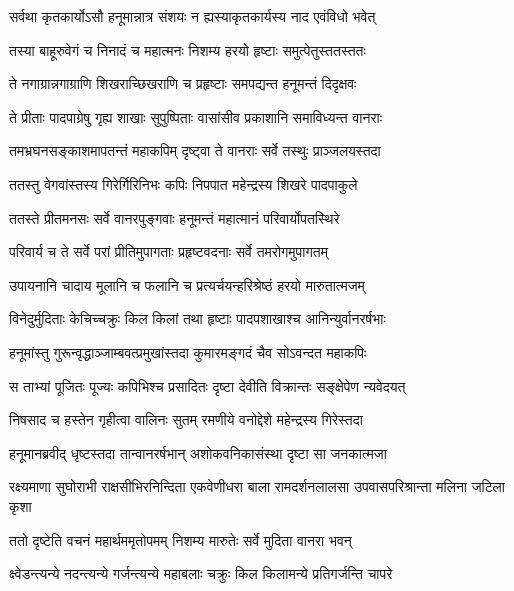 \twolineshloka
{सर्वथा कृतकार्योऽसौ हनूमान्नात्र संशयः}
{न ह्यस्याकृतकार्यस्य नाद एवंविधो भवेत्} %

\twolineshloka
{तस्या बाहूरुवेगं च निनादं च महात्मनः}
{निशम्य हरयो हृष्टाः समुत्पेतुस्ततस्ततः} %

\twolineshloka
{ते नगाग्रान्नगाग्राणि शिखराच्छिखराणि च}
{प्रहृष्टाः समपद्यन्त हनूमन्तं दिदृक्षवः} %

\twolineshloka
{ते प्रीताः पादपाग्रेषु गृह्य शाखाः सुपुष्पिताः}
{वासांसीव प्रकाशानि समाविध्यन्त वानराः} %

\twolineshloka
{तमभ्रघनसङ्काशमापतन्तं महाकपिम्}
{दृष्ट्वा ते वानराः सर्वे तस्थुः प्राञ्जलयस्तदा} %

\twolineshloka
{ततस्तु वेगवांस्तस्य गिरेर्गिरिनिभः कपिः}
{निपपात महेन्द्रस्य शिखरे पादपाकुले} %

\twolineshloka
{ततस्ते प्रीतमनसः सर्वे वानरपुङ्गवाः}
{हनूमन्तं महात्मानं परिवार्योपतस्थिरे} %

\twolineshloka
{परिवार्य च ते सर्वे परां प्रीतिमुपागताः}
{प्रहृष्टवदनाः सर्वे तमरोगमुपागतम्} %

\twolineshloka
{उपायनानि चादाय मूलानि च फलानि च}
{प्रत्यर्चयन्हरिश्रेष्ठं हरयो मारुतात्मजम्} %

\twolineshloka
{विनेदुर्मुदिताः केचिच्चक्रुः किल किलां तथा}
{हृष्टाः पादपशाखाश्च आनिन्युर्वानरर्षभाः} %

\twolineshloka
{हनूमांस्तु गुरून्वृद्धाञ्जाम्बवत्प्रमुखांस्तदा}
{कुमारमङ्गदं चैव सोऽवन्दत महाकपिः} %

\twolineshloka
{स ताभ्यां पूजितः पूज्यः कपिभिश्च प्रसादितः}
{दृष्टा देवीति विक्रान्तः सङ्क्षेपेण न्यवेदयत्} %

\twolineshloka
{निषसाद च हस्तेन गृहीत्वा वालिनः सुतम्}
{रमणीये वनोद्देशे महेन्द्रस्य गिरेस्तदा} %

\twolineshloka
{हनूमानब्रवीद् धृष्टस्तदा तान्वानरर्षभान्}
{अशोकवनिकासंस्था दृष्टा सा जनकात्मजा} %

\threelineshloka
{रक्ष्यमाणा सुघोराभी राक्षसीभिरनिन्दिता}
{एकवेणीधरा बाला रामदर्शनलालसा}
{उपवासपरिश्रान्ता मलिना जटिला कृशा} %

\twolineshloka
{ततो दृष्टेति वचनं महार्थममृतोपमम्}
{निशम्य मारुतेः सर्वे मुदिता वानरा भवन्} %

\twolineshloka
{क्ष्वेडन्त्यन्ये नदन्त्यन्ये गर्जन्त्यन्ये महाबलाः}
{चक्रुः किल किलामन्ये प्रतिगर्जन्ति चापरे} %

